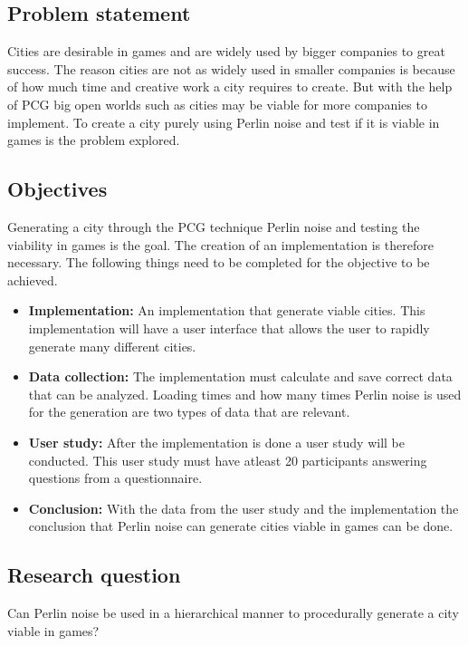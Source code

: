 	\subsection{Problem statement}
	Cities are desirable in games and are widely used by bigger companies to great success. The reason cities are not as widely used in smaller companies is because of how much time and creative work a city requires to create. But with the help of PCG big open worlds such as cities may be viable for more companies to implement.
	To create a city purely using Perlin noise and test if it is viable in games is the problem explored.
	
	\subsection{Objectives}
	Generating a city through the PCG technique Perlin noise and testing the viability in games is the goal. The creation of an implementation is therefore necessary.
	The following things need to be completed for the objective to be achieved.
	
	\begin{itemize}
		\item \textbf{Implementation:} An implementation that generate viable cities. This implementation will have a user interface that allows the user to rapidly generate many different cities.
		
		\item \textbf{Data collection:} The implementation must calculate and save correct data that can be analyzed. Loading times and how many times Perlin noise is used for the generation are two types of data that are relevant.
		
		\item \textbf{User study:} After the implementation is done a user study will be conducted. This user study must have atleast 20 participants answering questions from a questionnaire.
		
		\item \textbf{Conclusion: } With the data from the user study and the implementation the conclusion that Perlin noise can generate cities viable in games can be done.
	\end{itemize} 
	
	\subsection{Research question}
	Can Perlin noise be used in a hierarchical manner to procedurally generate a city viable in games?
